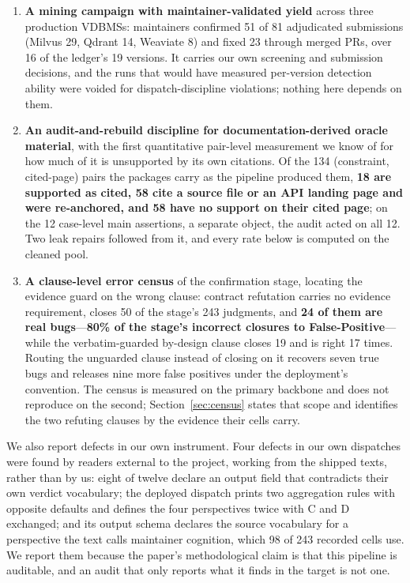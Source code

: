 \documentclass[acmsmall,screen,review,anonymous]{acmart}
\begin{document}
\begin{enumerate}
  \item \textbf{A mining campaign with maintainer-validated yield} across three production VDBMSs:
    maintainers confirmed 51 of 81 adjudicated submissions (Milvus 29, Qdrant 14, Weaviate 8) and
    fixed 23 through merged PRs, over 16 of the ledger's 19 versions. It carries our own screening
    and submission decisions, and the runs that would have measured per-version detection ability
    were voided for dispatch-discipline violations; nothing here depends on them.
  \item \textbf{An audit-and-rebuild discipline for documentation-derived oracle material}, with the
    first quantitative pair-level measurement we know of for how much of it is unsupported by its own
    citations. Of the 134 (constraint, cited-page) pairs the packages carry as the pipeline produced
    them, \textbf{18 are supported as cited, 58 cite a source file or an API landing page and were
    re-anchored, and 58 have no support on their cited page}; on the 12 case-level main assertions, a
    separate object, the audit acted on all 12. Two leak repairs followed from it, and every rate
    below is computed on the cleaned pool.
  \item \textbf{A clause-level error census} of the confirmation stage, locating the evidence guard
    on the wrong clause: contract refutation carries no evidence requirement, closes 50 of the
    stage's 243 judgments, and \textbf{24 of them are real bugs}---\textbf{80\% of the stage's
    incorrect closures to False-Positive}---while the verbatim-guarded by-design clause closes 19 and
    is right 17 times. Routing the unguarded clause instead of closing on it recovers seven true bugs
    and releases nine more false positives under the deployment's convention. The census is measured
    on the primary backbone and does not reproduce on the second; Section~\ref{sec:census} states
    that scope and identifies the two refuting clauses by the evidence their cells carry.
\end{enumerate}

We also report defects in our own instrument. Four defects in our own dispatches were found by
readers external to the project, working from the shipped texts, rather than by us: eight of twelve declare an output field that
contradicts their own verdict vocabulary; the deployed dispatch prints two aggregation rules with
opposite defaults and defines the four perspectives twice with C and D exchanged; and its output
schema declares the source vocabulary for a perspective the text calls maintainer cognition, which
98 of 243 recorded cells use. We report them because the paper's methodological claim is that this
pipeline is auditable, and an audit that only reports what it finds in the target is not one.
\end{document}
